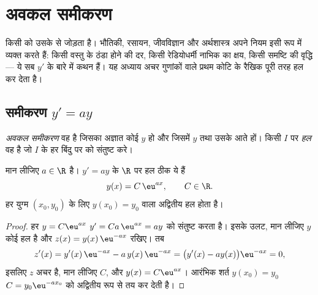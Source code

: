 \chapter{अवकल समीकरण}\label{ch:g12:diffeq}

 किसी  को उसके  से जोड़ता है। भौतिकी, रसायन, जीवविज्ञान
और अर्थशास्त्र अपने नियम इसी रूप में व्यक्त करते हैं: किसी वस्तु के ठंडा होने
की दर, किसी रेडियोधर्मी नाभिक का क्षय, किसी समष्टि की वृद्धि --- ये सब $y'$ के
बारे में कथन हैं। यह अध्याय अचर गुणांकों वाले प्रथम कोटि के रैखिक  पूरी
तरह हल कर देता है।

\section{समीकरण \texorpdfstring{$y' = ay$}{y' = ay}}

\begin{definition}\label{def:g12:diffeq:ode}
\emph{अवकल समीकरण} वह  है जिसका अज्ञात कोई  $y$
हो और जिसमें $y$ तथा उसके  आते हों। किसी  $I$ पर \emph{हल} वह
  है जो $I$ के हर बिंदु पर  को संतुष्ट करे।
\end{definition}

\begin{theorem}[$y' = ay$ के हल]\label{thm:g12:diffeq:homogeneous}
मान लीजिए $a \in \R$ है।  $y' = ay$ के $\R$ पर हल ठीक ये  हैं
\[
y(x) = C\,\eu^{ax}, \qquad C \in \R .
\]
हर युग्म $(x_0, y_0)$ के लिए $y(x_0) = y_0$ वाला अद्वितीय हल होता है।
\end{theorem}

\begin{proof}
हर $y = C\eu^{ax}$ $y' = Ca\,\eu^{ax} = ay$ को संतुष्ट करता है। इसके उलट, मान लीजिए $y$ कोई हल है और $z(x) = y(x)\,\eu^{-ax}$
रखिए। तब
\[
z'(x) = y'(x)\,\eu^{-ax} - a\,y(x)\,\eu^{-ax}
= \bigl(y'(x) - a y(x)\bigr)\eu^{-ax} = 0,
\]
इसलिए $z$ अचर है, मान लीजिए $C$, और $y(x) = C\eu^{ax}$। आरंभिक शर्त $y(x_0) = y_0$ $C = y_0 \eu^{-a x_0}$ को
अद्वितीय रूप से तय कर देती है।
\end{proof}

